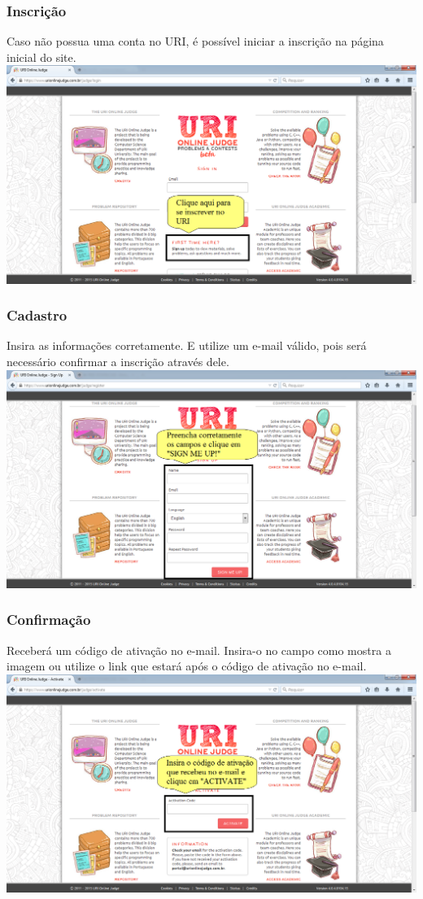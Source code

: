 \begin{frame}
\frametitle{Inscrição}
Caso não possua uma conta no URI, é possível iniciar a inscrição na página inicial do site.
 \includegraphics[scale=.28]{uri/Imagens/01Login.png}
\end{frame}

\begin{frame}
 \frametitle{Cadastro}
 Insira as informações corretamente. E utilize um e-mail válido,
 pois será necessário confirmar a inscrição através dele.
 \includegraphics[scale=.28]{uri/Imagens/02Cadastro.png}
\end{frame}

\begin{frame}
  \frametitle{Confirmação}
Receberá um código de ativação no e-mail. Insira-o no campo como mostra a imagem
ou utilize o link que estará após o código de ativação no e-mail.
 \includegraphics[scale=.28]{uri/Imagens/03Confirmacao.png}
\end{frame}

